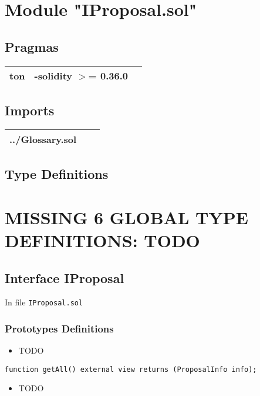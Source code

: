 
\section{Module "IProposal.sol"}


\subsection{Pragmas}


\noindent\begin{tabular}{|l|l|p{5cm}|}\hline
ton & -solidity $>$= 0.36.0 &\\\hline
\end{tabular}


\subsection{Imports}


\noindent\begin{tabular}{|l|l|p{5cm}|}\hline
../Glossary.sol &\\\hline
\end{tabular}


\subsection{Type Definitions}

\section{MISSING 6 GLOBAL TYPE DEFINITIONS: TODO}

\subsection{Interface IProposal}

\minitoc

In file {\tt IProposal.sol}

\subsubsection{Prototypes Definitions}

\begin{itemize}
\item TODO
\end{itemize}

\begin{lstlisting}[firstnumber=55]
    function getAll() external view returns (ProposalInfo info);
\end{lstlisting}
\begin{itemize}
\item TODO
\end{itemize}

